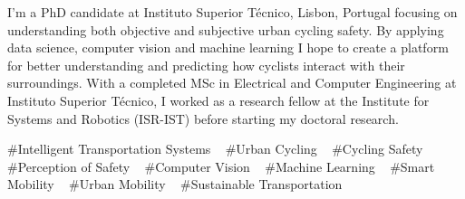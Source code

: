 

\begin{cvparagraph}

I'm a PhD candidate at Instituto Superior Técnico, Lisbon, Portugal focusing on understanding both objective 
and subjective urban cycling safety. By applying data science, computer vision and machine learning I hope to 
create a platform for better understanding and predicting how cyclists interact with their surroundings. 
With a completed MSc in Electrical and Computer Engineering at Instituto Superior Técnico, 
I worked as a research fellow at the Institute for Systems and Robotics (ISR-IST) before starting my doctoral research.


\end{cvparagraph}
\begin{cvtechnologies}
 \#Intelligent Transportation Systems ~
 \#Urban Cycling ~
 \#Cycling Safety ~
 \#Perception of Safety ~
 \#Computer Vision ~
 \#Machine Learning ~
 \#Smart Mobility ~
 \#Urban Mobility ~
 \#Sustainable Transportation
\end{cvtechnologies}
